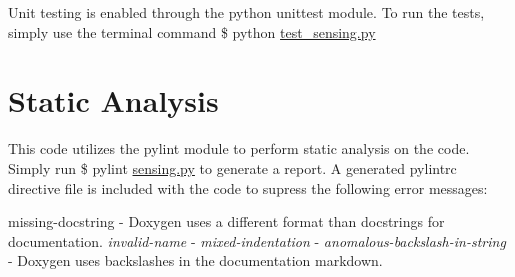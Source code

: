Unit testing is enabled through the python unittest module. To run the tests, simply use the terminal command \$ python \hyperlink{test__sensing_8py}{test\-\_\-sensing.\-py}\hypertarget{index_static}{}\section{Static Analysis}\label{index_static}
This code utilizes the pylint module to perform static analysis on the code. Simply run \$ pylint \hyperlink{sensing_8py}{sensing.\-py} to generate a report. A generated pylintrc directive file is included with the code to supress the following error messages\-:
\begin{DoxyItemize}
\item missing-\/docstring -\/ Doxygen uses a different format than docstrings for documentation. {\itshape invalid-\/name} -\/ {\itshape mixed-\/indentation} -\/ {\itshape anomalous-\/backslash-\/in-\/string} -\/ Doxygen uses backslashes in the documentation markdown. 
\end{DoxyItemize}